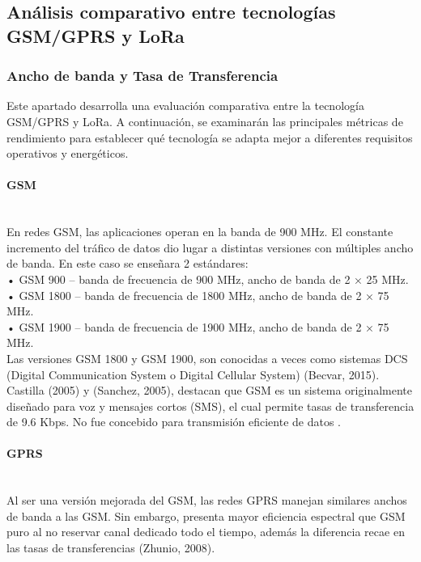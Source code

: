 \documentclass[12pt,a4paper]{article}
\begin{document}
	\subsection{Análisis comparativo entre tecnologías GSM/GPRS y LoRa}
	
	\subsubsection{Ancho de banda y Tasa de Transferencia}
	
	Este apartado desarrolla una evaluación comparativa entre la tecnología GSM/GPRS y LoRa. A continuación, se examinarán las principales métricas de rendimiento para establecer qué tecnología se adapta mejor a diferentes requisitos operativos y energéticos.
	
	\paragraph*{GSM} \mbox{}\\
	
	En redes GSM, las aplicaciones operan en la banda de 900 MHz. El constante incremento del tráfico de datos dio lugar a distintas versiones con múltiples ancho de banda. En este caso se enseñara 2 estándares:\\	
	• GSM 900 – banda de frecuencia de 900 MHz, ancho de banda de 2 × 25 MHz.\\
	• GSM 1800 – banda de frecuencia de 1800 MHz, ancho de banda de 2 × 75 MHz.\\
	• GSM 1900 – banda de frecuencia de 1900 MHz, ancho de banda de 2 × 75 MHz.\\
	
	Las versiones GSM 1800 y GSM 1900, son conocidas a veces como sistemas DCS (Digital Communication System o Digital Cellular System) (Becvar, 2015).\\
	
	Castilla (2005) y (Sanchez, 2005), destacan que GSM es un sistema originalmente diseñado para voz y  mensajes cortos (SMS), el cual permite tasas de transferencia de 9.6 Kbps. No fue concebido para transmisión eficiente de datos .
	
	\paragraph*{GPRS} \mbox{}\\
	
	Al ser una versión mejorada del GSM, las redes GPRS manejan similares anchos de banda a las GSM. Sin embargo, presenta mayor eficiencia espectral que GSM puro al no reservar canal dedicado todo el tiempo, además la diferencia recae en las tasas de transferencias (Zhunio, 2008).\\
	
\end{document}
